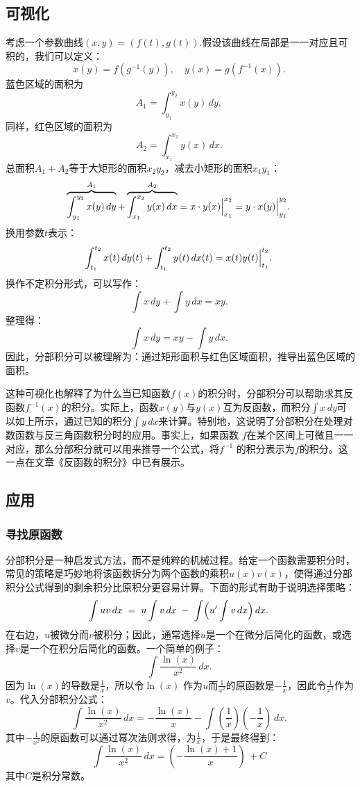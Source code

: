 \subsection{可视化}
考虑一个参数曲线$(x,y) = (f(t), g(t))$.假设该曲线在局部是一一对应且可积的，我们可以定义：
$$
x(y) = f(g^{-1}(y)), \quad y(x) = g(f^{-1}(x)).~
$$
蓝色区域的面积为
$$
A_{1} = \int_{y_{1}}^{y_{2}} x(y)\,dy,~
$$
同样，红色区域的面积为
$$
A_{2} = \int_{x_{1}}^{x_{2}} y(x)\,dx.~
$$
总面积$A_1 + A_2$等于大矩形的面积$x_{2}y_{2}$，减去小矩形的面积$x_{1}y_{1}$：
$$
\overbrace{\int_{y_{1}}^{y_{2}} x(y)\,dy}^{A_{1}}
+ \overbrace{\int_{x_{1}}^{x_{2}} y(x)\,dx}^{A_{2}}
= \Bigl. x \cdot y(x) \Bigr|_{x_{1}}^{x_{2}}
= \Bigl. y \cdot x(y) \Bigr|_{y_{1}}^{y_{2}}.~
$$
换用参数$t$表示：
$$
\int_{t_{1}}^{t_{2}} x(t)\,dy(t) + \int_{t_{1}}^{t_{2}} y(t)\,dx(t) 
= \Bigl. x(t)y(t) \Bigr|_{t_{1}}^{t_{2}}.~
$$
换作不定积分形式，可以写作：
$$
\int x\,dy + \int y\,dx = xy.~
$$
整理得：
$$
\int x\,dy = xy - \int y\,dx.~
$$
因此，分部积分可以被理解为：通过矩形面积与红色区域面积，推导出蓝色区域的面积。

这种可视化也解释了为什么当已知函数$f(x)$的积分时，分部积分可以帮助求其反函数$f^{-1}(x)$的积分。实际上，函数$x(y)$与$y(x)$互为反函数，而积分$\int x\,dy$可以如上所示，通过已知的积分$\int y\,dx$来计算。特别地，这说明了分部积分在处理对数函数与反三角函数积分时的应用。事实上，如果函数 $f$在某个区间上可微且一一对应，那么分部积分就可以用来推导一个公式，将$f^{-1}$ 的积分表示为$f$的积分。这一点在文章《反函数的积分》中已有展示。
\subsection{应用}
\subsubsection{寻找原函数}
分部积分是一种启发式方法，而不是纯粹的机械过程。给定一个函数需要积分时，常见的策略是巧妙地将该函数拆分为两个函数的乘积$u(x)v(x)$，使得通过分部积分公式得到的剩余积分比原积分更容易计算。下面的形式有助于说明选择策略：
$$
\int uv\,dx \;=\; u \int v\,dx \;-\; \int \Bigl(u' \int v\,dx\Bigr)\,dx .~
$$
在右边，$u$被微分而$v$被积分；因此，通常选择$u$是一个在微分后简化的函数，或选择$v$是一个在积分后简化的函数。一个简单的例子：
$$
\int \frac{\ln(x)}{x^{2}}\,dx .~
$$
因为$\ln(x)$的导数是$\tfrac{1}{x}$，所以令$\ln(x)$ 作为$u$而$\tfrac{1}{x^2}$的原函数是$-\tfrac{1}{x}$，因此令$\tfrac{1}{x^2}$作为$v$。代入分部积分公式：
$$
\int \frac{\ln(x)}{x^{2}}\,dx
= -\frac{\ln(x)}{x} - \int \left(\frac{1}{x}\right)\left(-\frac{1}{x}\right)\,dx .~
$$
其中$-\tfrac{1}{x^2}$的原函数可以通过幂次法则求得，为$\tfrac{1}{x}$，于是最终得到：
$$
\int \frac{\ln(x)}{x^{2}}\,dx
= \left(-\frac{\ln(x) + 1}{x}\right)\, + C~
$$
其中$C$是积分常数。

